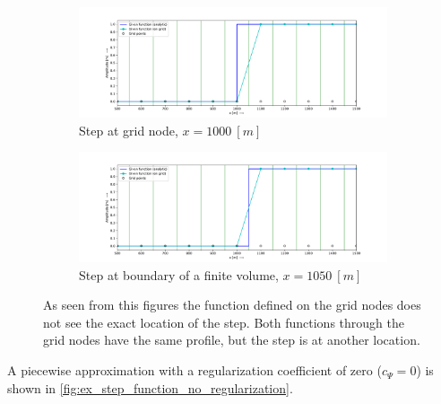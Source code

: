 \begin{figure}[H]
    \centering
    \begin{subfigure}[t]{0.49\textwidth}
        \centering
        \includegraphics[width=1.0\textwidth]{figures/regul_1_1d_scalar_dx100.pdf}
        \caption{Step at grid node, $x = 1000\ [m]$}
    \end{subfigure}
    \hfill
    \begin{subfigure}[t]{0.49\textwidth}
        \centering
        \includegraphics[width=1.0\textwidth]{figures/regul_2_1d_scalar_dx100.pdf}
        \caption{Step at boundary of a finite volume, $x = 1050\ [m]$}
    \end{subfigure}
    \caption{As seen from this figures the function defined on the grid nodes does not see the exact location of the step. Both functions through the grid nodes have the same profile, but the step is at another location. \label{fig:straight_forward_discretization}}
\end{figure}
%
A piecewise approximation with a regularization coefficient of zero ($c_\Psi = 0$) is shown in \autoref{fig:ex_step_function_no_regularization}.
%
